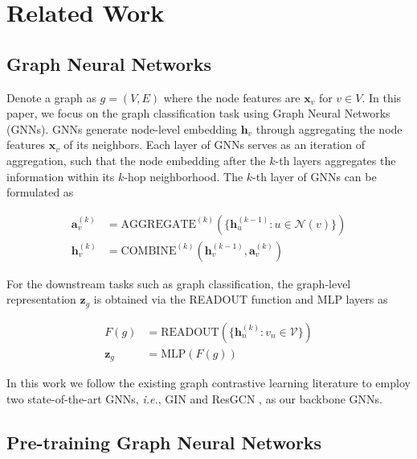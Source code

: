 \section{Related Work}

\subsection{Graph Neural Networks}
Denote a graph as $g=(V, E)$ where the node features are $\boldsymbol{x}_v$ for $v \in V$. In this paper, we focus on the graph classification task using Graph Neural Networks (GNNs). GNNs generate node-level embedding $\boldsymbol{h}_v$ through aggregating the node features $\boldsymbol{x}_v$ of its neighbors. Each layer of GNNs serves as an iteration of aggregation, such that the node embedding after the $k$-th layers aggregates the information within its $k$-hop neighborhood. The $k$-th layer of GNNs can be formulated as
\begin{small}
    \begin{align}
    \boldsymbol{a}_v^{(k)} &= \text{AGGREGATE}^{(k)}  ( \{ \boldsymbol{h}_u^{(k-1)} : u \in \mathcal{N}(v) \} ) \\
    \boldsymbol{h}_v^{(k)} &= \text{COMBINE}^{(k)} ( \boldsymbol{h}_v^{(k-1)}, \boldsymbol{a}_v^{(k)} )
    \end{align}
\end{small}
For the downstream tasks such as graph classification, the graph-level representation $\boldsymbol{z}_g$ is obtained via the READOUT function and MLP layers as
\begin{small}
    \begin{align}
    F(g) &= \text{READOUT}(\{ \boldsymbol{h}_n^{(k)}: v_n \in \mathcal{V} \} ) \\
    \boldsymbol{z}_g &= \text{MLP} (  F(g) )
    \end{align}
\end{small}
In this work we follow the existing graph contrastive learning literature to employ two state-of-the-art GNNs, \textit{i.e.}, GIN \cite{xu2018gin} and ResGCN \cite{chen2019gfn}, as our backbone GNNs. 

\subsection{Pre-training Graph Neural Networks}

